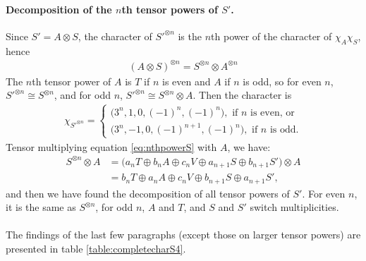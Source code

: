 \paragraph{Decomposition of the $n$th tensor powers of $S'$.} Since $S' = A \otimes S$, the character of $S'^{\otimes n}$ is the $n$th power of the character of $\chi_A \chi_S$, hence%
\begin{align}
	(A \otimes S)^{\otimes n} = S^{\otimes n} \otimes A^{\otimes n}
\end{align}
The $n$th tensor power of $A$ is $T$ if $n$ is even and $A$ if $n$ is odd, so for even $n$, $S'^{\otimes n} \cong S^{\otimes n}$, and for odd $n$, $S'^{\otimes n} \cong S^{\otimes n} \otimes A$. Then the character is 
\begin{align}
	\chi_{S'^{\otimes n}} = \begin{cases}
		\big(3^n,1,0,(-1)^{n}, (-1)^n\big), \text{ if } n \text{ is even, or} \\
		\big(3^n,-1,0,(-1)^{n+1}, (-1)^n\big), \text{ if } n \text{ is odd.}
	\end{cases}
\end{align}
Tensor multiplying equation \ref{eq:nthpowerS} with $A$, we have:
\begin{align}
	S^{\otimes n} \otimes A &= \Big(a_n T \oplus b_n A \oplus c_n V \oplus a_{n+1} S \oplus b_{n+1} S'\Big)\otimes A \\
	&= b_n T \oplus a_n A \oplus c_n V \oplus b_{n+1} S \oplus a_{n+1} S',
\end{align}
and then we have found the decomposition of all tensor powers of $S'$. For even $n$, it is the same as $S^{\otimes n}$, for odd $n$, $A$ and $T$, and $S$ and $S'$ switch multiplicities.

\paragraph{} The findings of the last few paragraphs (except those on larger tensor powers) are presented in table \ref{table:completecharS4}.

